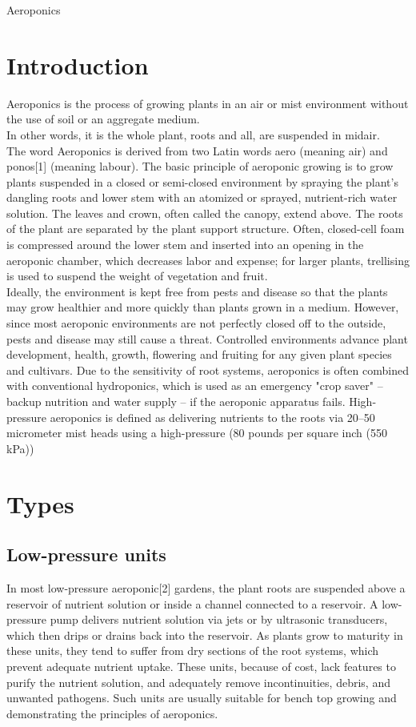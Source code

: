 \documentclass{article}
\begin{document}
\begin{Huge}
\begin{center}
Aeroponics
\end{center}
\end{Huge}
\section{Introduction}
Aeroponics is the process of growing plants in an air or mist environment without the use of soil or an aggregate medium.\\
In other words, it is the whole plant, roots and all, are suspended in midair.\\
The word Aeroponics is derived from two Latin words aero (meaning air) and ponos[1] (meaning labour).
The basic principle of aeroponic growing is to grow plants suspended in a closed or semi-closed environment by spraying the plant's dangling roots and lower stem with an atomized or sprayed, nutrient-rich water solution. The leaves and crown, often called the canopy, extend above. The roots of the plant are separated by the plant support structure. Often, closed-cell foam is compressed around the lower stem and inserted into an opening in the aeroponic chamber, which decreases labor and expense; for larger plants, trellising is used to suspend the weight of vegetation and fruit.\\
Ideally, the environment is kept free from pests and disease so that the plants may grow healthier and more quickly than plants grown in a medium. However, since most aeroponic environments are not perfectly closed off to the outside, pests and disease may still cause a threat. Controlled environments advance plant development, health, growth, flowering and fruiting for any given plant species and cultivars.
Due to the sensitivity of root systems, aeroponics is often combined with conventional hydroponics, which is used as an emergency "crop saver" – backup nutrition and water supply – if the aeroponic apparatus fails.
High-pressure aeroponics is defined as delivering nutrients to the roots via 20–50 micrometer mist heads using a high-pressure (80 pounds per square inch (550 kPa))
\section{Types}
\subsection{Low-pressure units}
In most low-pressure aeroponic[2] gardens, the plant roots are suspended above a reservoir of nutrient solution or inside a channel connected to a reservoir. A low-pressure pump delivers nutrient solution via jets or by ultrasonic transducers, which then drips or drains back into the reservoir. As plants grow to maturity in these units, they tend to suffer from dry sections of the root systems, which prevent adequate nutrient uptake. These units, because of cost, lack features to purify the nutrient solution, and adequately remove incontinuities, debris, and unwanted pathogens. Such units are usually suitable for bench top growing and demonstrating the principles of aeroponics.
\end{document}
